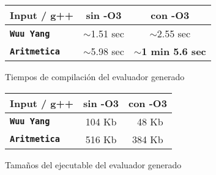 \documentclass[runningheads,a4paper]{llncs}
\newcommand{\textbtt}[1]{\texttt{\textbf{#1}}}
\begin{document}
\begin{figure}[h]
        \begin{center}
        \setlength{\doublerulesep}{0mm}
        \setlength{\arrayrulewidth}{0.9pt}
        \begin{tabular}{|l||c|c|}
            \hline
            \rowcolor{gris} Input / g++          & \textbf{sin -O3} & \textbf{con -O3}             \\ \hline
            \rowcolor{white}\textbtt{Wuu Yang}   & $\sim$1.51 sec   & $\sim$2.55 sec               \\ \hline
            \rowcolor{white}\textbtt{Aritmetica} & $\sim$5.98 sec   & \textbf{$\sim$1 min 5.6 sec} \\ \hline
        \end{tabular}
        \end{center}
\caption{Tiempos de compilación del evaluador generado}
        \end{figure}

\begin{figure}[h]
        \begin{center}
        \setlength{\doublerulesep}{0mm}
        \setlength{\arrayrulewidth}{0.9pt}      
        \begin{tabular}{|l||c|c|}
            \hline
            \rowcolor{gris} Input / g++          & \textbf{sin -O3} & \textbf{con -O3} \\ \hline
            \rowcolor{white}\textbtt{Wuu Yang}   & 104 Kb           & \ 48 Kb          \\ \hline
            \rowcolor{white}\textbtt{Aritmetica} & 516 Kb           & 384 Kb           \\ \hline
        \end{tabular}
        \end{center}
\caption{Tamaños del ejecutable del evaluador generado}
        \end{figure}
\end{document}
